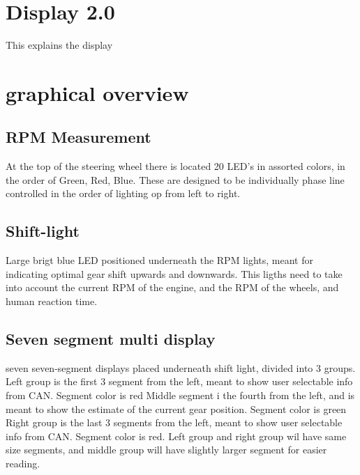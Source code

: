 \section{Display 2.0}
This explains the display


\section{graphical overview}
\subsection*{RPM Measurement}
At the top of the steering wheel there is located 20 LED's in assorted colors, in the order of Green, Red, Blue. These are designed to be individually phase line controlled in the order of lighting op from left to right.

\subsection*{Shift-light}
Large brigt blue LED positioned underneath the RPM lights, meant for indicating optimal gear shift upwards and downwards. This ligths need to take into account the current RPM of the engine, and the RPM of the wheels, and human reaction time.

\subsection*{Seven segment multi display}
seven seven-segment displays placed underneath shift light, divided into 3 groups.\newline
Left group is the first 3 segment from the left, meant to show user selectable info from CAN. Segment color is red\newline
Middle segment i the fourth from the left, and is meant to show the estimate of the current gear position. Segment color is green\newline
Right group is the last 3 segments from the left, meant to show user selectable info from CAN. Segment color is red.\newline
Left group and right group wil have same size segments, and middle group will have slightly larger segment for easier reading.

